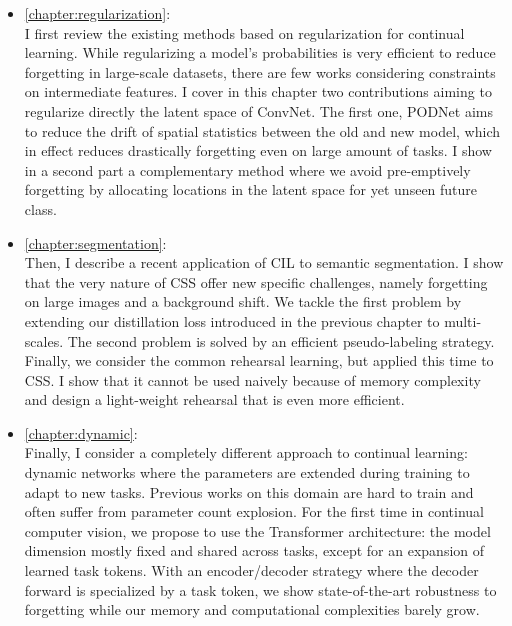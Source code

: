\begin{itemize}
      \item \autoref{chapter:regularization}: \\
            I first review the existing methods based on regularization for continual learning. While
            regularizing a model's probabilities is very efficient to reduce forgetting in large-scale
            datasets, there are few works considering constraints on intermediate features. I cover in this
            chapter two contributions aiming to regularize directly the latent space of \acs{ConvNet}. The
            first one, \acf{PODNet} aims to reduce the drift of spatial statistics between the old and new
            model, which in effect reduces drastically forgetting even on large amount of tasks. I show in a
            second part a complementary method where we avoid pre-emptively forgetting by allocating
            locations in the latent space for yet unseen future class.
      \item \autoref{chapter:segmentation}: \\
            Then, I describe a recent application of \acf{CIL} to semantic segmentation. I show that
            the very nature of \acf{CSS} offer new specific challenges, namely forgetting on large
            images and a background shift. We tackle the first problem by extending our distillation
            loss introduced in the previous chapter to multi-scales. The second problem is solved by
            an efficient pseudo-labeling strategy. Finally, we consider the common rehearsal learning,
            but applied this time to \ac{CSS}. I show that it cannot be used naively because of memory
            complexity and design a light-weight rehearsal that is even more efficient.
      \item \autoref{chapter:dynamic}: \\
            Finally, I consider a completely different approach to continual learning: dynamic networks
            where the parameters are extended during training to adapt to new tasks. Previous works on
            this domain are hard to train and often suffer from parameter count explosion. For the
            first time in continual computer vision, we propose to use the Transformer architecture:
            the model dimension mostly fixed and shared across tasks, except for an
            expansion of learned task tokens. With an encoder/decoder strategy where the decoder
            forward is specialized by a task token, we show state-of-the-art robustness to forgetting
            while our memory and computational complexities barely grow.
\end{itemize}

